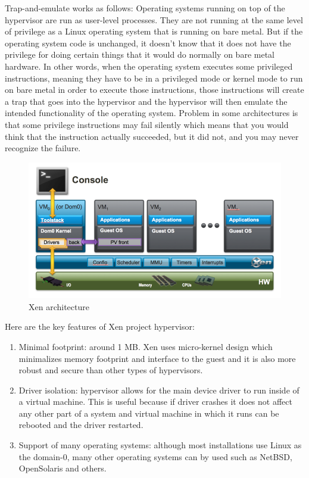 Trap-and-emulate works as follows: Operating systems running on top of the hypervisor are run as user-level processes. They are not running at the same level of privilege as a Linux operating system that is running on bare metal. But if the operating system code is unchanged, it doesn't know that it does not have the privilege for doing certain things that it would do normally on bare metal hardware. In other words, when the operating system executes some privileged instructions, meaning they have to be in a privileged mode or kernel mode to run on bare metal in order to execute those instructions, those instructions will create a trap that goes into the hypervisor and the hypervisor will then emulate the intended functionality of the operating system. Problem in some architectures is that some privilege instructions may fail silently which means that you would think that the instruction actually succeeded, but it did not, and you may never recognize the failure.

\begin{figure}[H]
\centering
\includegraphics[scale=1]{xen-diagram.png}
\caption{Xen architecture}
\end{figure}

Here are the key features of Xen project hypervisor:
\begin{enumerate}
\item Minimal footprint: around 1 MB. Xen uses micro-kernel design which minimalizes memory footprint and interface to the guest and it is also more robust and secure than other types of hypervisors.
\item Driver isolation: hypervisor allows for the main device driver to run inside of a virtual machine. This is useful because if driver crashes it does not affect any other part of a system and virtual machine in which it runs can be rebooted and the driver restarted.
\item Support of many operating systems: although most installations use Linux as the domain-0, many other operating systems can by used such as NetBSD, OpenSolaris and others.
\end{enumerate}


